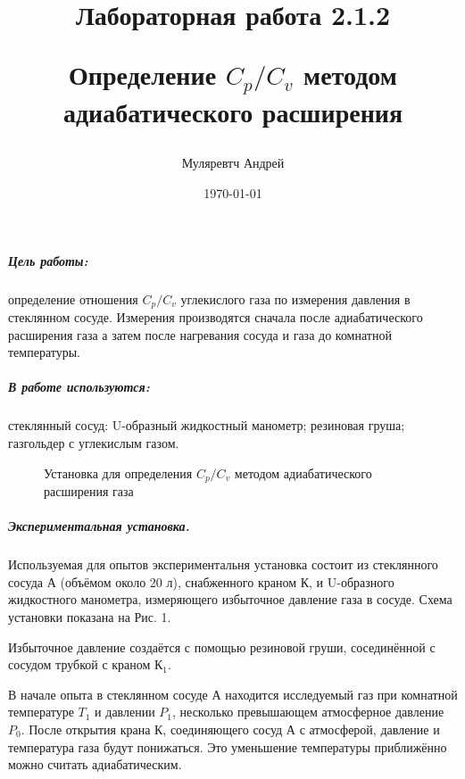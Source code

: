 \documentclass[a4paper,12pt]{article}
\author{Муляревтч Андрей}
\title{Лабораторная работа 2.1.2

Определение $C_p / C_v$ методом адиабатического расширения}
\date{\today}
\begin{document}
	
\maketitle 
	
	
\newpage


\subparagraph*{Цель работы:}определение отношения $C_p / C_v$ углекислого газа  по измерения давления в стеклянном сосуде. Измерения производятся сначала после адиабатического расширения газа а затем после нагревания сосуда и газа до комнатной температуры. 
\subparagraph*{В работе используются:}стеклянный сосуд: U-образный жидкостный манометр; резиновая груша; газгольдер с углекислым газом. 

\begin{figure}[b!]	\label{plan2}
	
	\caption{Установка для определения $C_p / C_v$ методом адиабатического расширения газа}
	
\end{figure}



\subparagraph*{Экспериментальная установка.} Используемая для опытов экспериментальня установка состоит из стеклянного сосуда А (объёмом около 20 л), снабженного краном К, и U-образного жидкостного манометра, измеряющего избыточное давление газа в сосуде. Схема установки показана на Рис. 1. 

Избыточное давление создаётся с помощью резиновой груши, сосединённой с сосудом трубкой с краном $К_1$.

В начале опыта  в стеклянном сосуде А находится исследуемый газ при комнатной температуре $T_1$ и давлении $P_1$, несколько превышающем атмосферное давление  $P_0$. После открытия крана К, соединяющего сосуд А с атмосферой, давление и температура газа будут понижаться. Это уменьшение температуры приближённо можно считать адиабатическим. 
\end{document}
